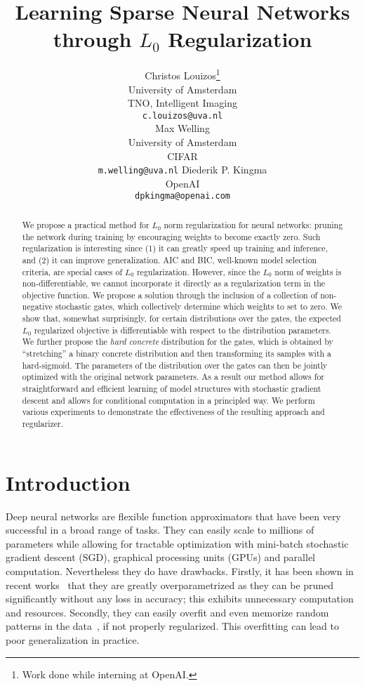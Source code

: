 \documentclass{article} %
\title{Learning Sparse Neural Networks\\through $L_0$ Regularization}
\author{
	Christos Louizos\thanks{Work done while interning at OpenAI.}\\
	University of Amsterdam\\
	TNO, Intelligent Imaging\\
	\texttt{c.louizos@uva.nl} \\
	\And
	Max Welling \\
	University of Amsterdam\\
	CIFAR\\
	\texttt{m.welling@uva.nl}
	\And
	Diederik P. Kingma\\
	OpenAI\\
	\texttt{dpkingma@openai.com}
}
\begin{document}
\maketitle

\begin{abstract}
We propose a practical method for $L_0$ norm regularization for neural networks: pruning the network during training by encouraging weights to become exactly zero. Such regularization is interesting since (1) it can greatly speed up training and inference, and (2) it can improve generalization. AIC and BIC, well-known model selection criteria, are special cases of $L_0$ regularization. However, since the $L_0$ norm of weights is non-differentiable, we cannot incorporate it directly as a regularization term in the objective function. We propose a solution through the inclusion of a collection of non-negative stochastic gates, which collectively determine which weights to set to zero. We show that, somewhat surprisingly, for certain distributions over the gates, the expected $L_0$ regularized objective is differentiable with respect to the distribution parameters. We further propose the \emph{hard concrete} distribution for the gates, which is obtained by ``stretching'' a binary concrete distribution and then transforming its samples with a hard-sigmoid. The parameters of the distribution over the gates can then be jointly optimized with the original network parameters. As a result our method allows for straightforward and efficient learning of model structures with stochastic gradient descent and allows for conditional computation in a principled way. We perform various experiments to demonstrate the effectiveness of the resulting approach and regularizer.
\end{abstract}

\section{Introduction}
Deep neural networks are flexible function approximators that have been very successful in a broad range of tasks. They can easily scale to millions of parameters while allowing for tractable optimization with mini-batch stochastic gradient descent (SGD), graphical processing units (GPUs) and parallel computation. Nevertheless they do have drawbacks. Firstly, it has been shown in recent works~\citep{han2015deep,ullrich2017soft,molchanov2017variational} that they are greatly overparametrized as they can be pruned significantly without any loss in accuracy; this exhibits unnecessary computation and resources. Secondly, they can easily overfit and even memorize random patterns in the data~\citep{zhang2016understanding}, if not properly regularized. This overfitting can lead to poor generalization in practice.
\end{document}

